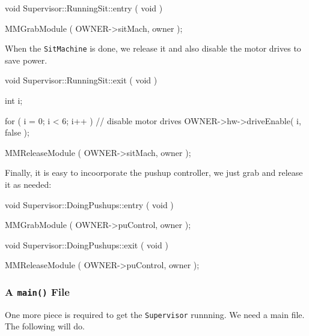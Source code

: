 \begin{codesegment}
void Supervisor::RunningSit::entry ( void ) {  

  MMGrabModule ( OWNER->sitMach, owner );

}
\end{codesegment}

\noindent When the {\tt SitMachine} is done, we release it and also disable
the motor drives to save power.

\begin{codesegment}
void Supervisor::RunningSit::exit ( void ) {

  int i;

  for ( i = 0; i < 6; i++ )  // disable motor drives
    OWNER->hw->driveEnable( i, false );

  MMReleaseModule ( OWNER->sitMach, owner );
}
\end{codesegment}

\noindent Finally, it is easy to incoorporate the pushup controller, we just grab and
release it as needed:

\begin{codesegment}
void Supervisor::DoingPushups::entry ( void ) {

  MMGrabModule ( OWNER->puControl, owner );

}

void Supervisor::DoingPushups::exit ( void ) {

  MMReleaseModule ( OWNER->puControl, owner );

}
\end{codesegment}

\subsubsection{A {\tt main()} File}

One more piece is required to get the {\tt Supervisor} runnning. We need a main
file. The following will do.

